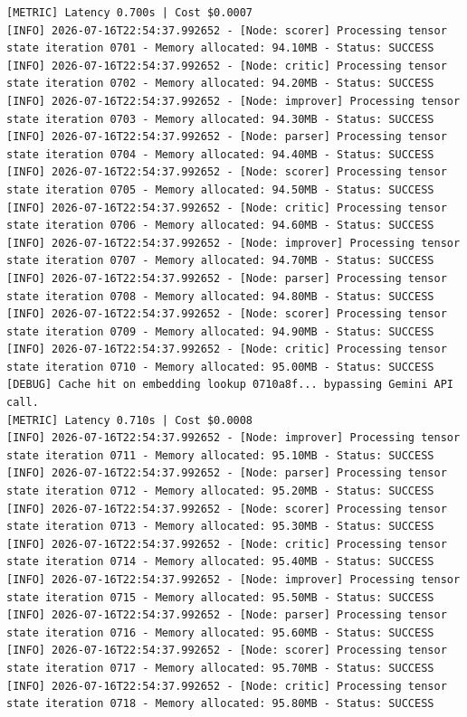 \documentclass[10pt,journal,compsoc]{IEEEtran}
\begin{document}
\begin{verbatim}
[METRIC] Latency 0.700s | Cost $0.0007
[INFO] 2026-07-16T22:54:37.992652 - [Node: scorer] Processing tensor state iteration 0701 - Memory allocated: 94.10MB - Status: SUCCESS
[INFO] 2026-07-16T22:54:37.992652 - [Node: critic] Processing tensor state iteration 0702 - Memory allocated: 94.20MB - Status: SUCCESS
[INFO] 2026-07-16T22:54:37.992652 - [Node: improver] Processing tensor state iteration 0703 - Memory allocated: 94.30MB - Status: SUCCESS
[INFO] 2026-07-16T22:54:37.992652 - [Node: parser] Processing tensor state iteration 0704 - Memory allocated: 94.40MB - Status: SUCCESS
[INFO] 2026-07-16T22:54:37.992652 - [Node: scorer] Processing tensor state iteration 0705 - Memory allocated: 94.50MB - Status: SUCCESS
[INFO] 2026-07-16T22:54:37.992652 - [Node: critic] Processing tensor state iteration 0706 - Memory allocated: 94.60MB - Status: SUCCESS
[INFO] 2026-07-16T22:54:37.992652 - [Node: improver] Processing tensor state iteration 0707 - Memory allocated: 94.70MB - Status: SUCCESS
[INFO] 2026-07-16T22:54:37.992652 - [Node: parser] Processing tensor state iteration 0708 - Memory allocated: 94.80MB - Status: SUCCESS
[INFO] 2026-07-16T22:54:37.992652 - [Node: scorer] Processing tensor state iteration 0709 - Memory allocated: 94.90MB - Status: SUCCESS
[INFO] 2026-07-16T22:54:37.992652 - [Node: critic] Processing tensor state iteration 0710 - Memory allocated: 95.00MB - Status: SUCCESS
[DEBUG] Cache hit on embedding lookup 0710a8f... bypassing Gemini API call.
[METRIC] Latency 0.710s | Cost $0.0008
[INFO] 2026-07-16T22:54:37.992652 - [Node: improver] Processing tensor state iteration 0711 - Memory allocated: 95.10MB - Status: SUCCESS
[INFO] 2026-07-16T22:54:37.992652 - [Node: parser] Processing tensor state iteration 0712 - Memory allocated: 95.20MB - Status: SUCCESS
[INFO] 2026-07-16T22:54:37.992652 - [Node: scorer] Processing tensor state iteration 0713 - Memory allocated: 95.30MB - Status: SUCCESS
[INFO] 2026-07-16T22:54:37.992652 - [Node: critic] Processing tensor state iteration 0714 - Memory allocated: 95.40MB - Status: SUCCESS
[INFO] 2026-07-16T22:54:37.992652 - [Node: improver] Processing tensor state iteration 0715 - Memory allocated: 95.50MB - Status: SUCCESS
[INFO] 2026-07-16T22:54:37.992652 - [Node: parser] Processing tensor state iteration 0716 - Memory allocated: 95.60MB - Status: SUCCESS
[INFO] 2026-07-16T22:54:37.992652 - [Node: scorer] Processing tensor state iteration 0717 - Memory allocated: 95.70MB - Status: SUCCESS
[INFO] 2026-07-16T22:54:37.992652 - [Node: critic] Processing tensor state iteration 0718 - Memory allocated: 95.80MB - Status: SUCCESS

\end{verbatim}
\end{document}
